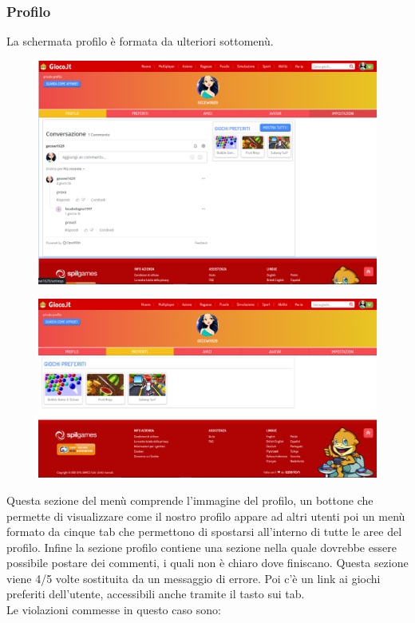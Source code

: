 \documentclass[../Report.tex]{subfiles}
\begin{document}
    \subsubsection{Profilo}
    La schermata profilo è formata da ulteriori sottomenù.

    \begin{figure}[H]
        \includegraphics[width=\linewidth]{Assestment13.png}
        \centering
    \end{figure}

    \begin{figure}[H]
        \includegraphics[width=\linewidth]{Assestment14.png}
        \centering
    \end{figure}
    Questa sezione del menù comprende l’immagine del profilo, un bottone che permette di visualizzare come il nostro profilo appare ad altri utenti poi un menù formato da cinque tab che permettono di spostarsi all’interno di tutte le aree del profilo. Infine la sezione profilo contiene una sezione nella quale dovrebbe essere possibile postare dei commenti, i quali non è chiaro dove finiscano. Questa sezione viene 4/5 volte sostituita da un messaggio di errore. Poi c’è un link ai giochi preferiti dell’utente, accessibili anche tramite il tasto sui tab. \\
    Le violazioni commesse in questo caso sono: \\
\end{document}
